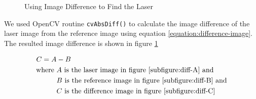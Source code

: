 \begin{figure}[ht!]
\centering
{} \hfill
{} \hfill
{} \hfill
\caption{Using Image Difference to Find the Laser}
\label{figure:difference-image}
\end{figure}

We used OpenCV routine \texttt{cvAbsDiff()} to calculate the image difference of the laser image from the reference image using equation \ref{equation:difference-image}. The resulted image difference is shown in figure \ref{figure:difference-image}

\begin{align}
\label{equation:difference-image}				
C = A &- B \\
\text{where}~ 
&A~ \text{is the laser image in figure \ref{subfigure:diff-A} and} \notag \\
&B~ \text{is the reference image in figure \ref{subfigure:diff-B} and} \notag \\
&C~ \text{is the difference image in figure \ref{subfigure:diff-C}} \notag
\end{align}

